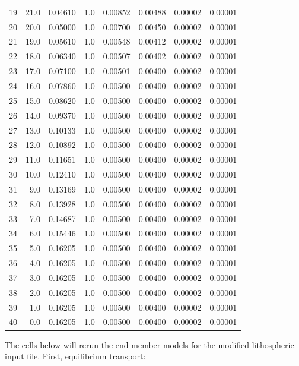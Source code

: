 \documentclass[draft]{agujournal2019}
\begin{document}
\begin{table} [H]
\begin{tabular}{r | r | r | r | r | r | r | r}
19 & 21.0 & 0.04610 & 1.0 & 0.00852 & 0.00488 & 0.00002 & 0.00001 \\
20 & 20.0 & 0.05000 & 1.0 & 0.00700 & 0.00450 & 0.00002 & 0.00001 \\
21 & 19.0 & 0.05610 & 1.0 & 0.00548 & 0.00412 & 0.00002 & 0.00001 \\
22 & 18.0 & 0.06340 & 1.0 & 0.00507 & 0.00402 & 0.00002 & 0.00001 \\
23 & 17.0 & 0.07100 & 1.0 & 0.00501 & 0.00400 & 0.00002 & 0.00001 \\
24 & 16.0 & 0.07860 & 1.0 & 0.00500 & 0.00400 & 0.00002 & 0.00001 \\
25 & 15.0 & 0.08620 & 1.0 & 0.00500 & 0.00400 & 0.00002 & 0.00001 \\
26 & 14.0 & 0.09370 & 1.0 & 0.00500 & 0.00400 & 0.00002 & 0.00001 \\
27 & 13.0 & 0.10133 & 1.0 & 0.00500 & 0.00400 & 0.00002 & 0.00001 \\
28 & 12.0 & 0.10892 & 1.0 & 0.00500 & 0.00400 & 0.00002 & 0.00001 \\
29 & 11.0 & 0.11651 & 1.0 & 0.00500 & 0.00400 & 0.00002 & 0.00001 \\
30 & 10.0 & 0.12410 & 1.0 & 0.00500 & 0.00400 & 0.00002 & 0.00001 \\
31 &  9.0 & 0.13169 & 1.0 & 0.00500 & 0.00400 & 0.00002 & 0.00001 \\
32 &  8.0 & 0.13928 & 1.0 & 0.00500 & 0.00400 & 0.00002 & 0.00001 \\
33 &  7.0 & 0.14687 & 1.0 & 0.00500 & 0.00400 & 0.00002 & 0.00001 \\
34 &  6.0 & 0.15446 & 1.0 & 0.00500 & 0.00400 & 0.00002 & 0.00001 \\
35 &  5.0 & 0.16205 & 1.0 & 0.00500 & 0.00400 & 0.00002 & 0.00001 \\
36 &  4.0 & 0.16205 & 1.0 & 0.00500 & 0.00400 & 0.00002 & 0.00001 \\
37 &  3.0 & 0.16205 & 1.0 & 0.00500 & 0.00400 & 0.00002 & 0.00001 \\
38 &  2.0 & 0.16205 & 1.0 & 0.00500 & 0.00400 & 0.00002 & 0.00001 \\
39 &  1.0 & 0.16205 & 1.0 & 0.00500 & 0.00400 & 0.00002 & 0.00001 \\
40 &  0.0 & 0.16205 & 1.0 & 0.00500 & 0.00400 & 0.00002 & 0.00001 \\
\hline
\end{tabular}
\end{table}


The cells below will rerun the end member models for the modified lithospheric input file. First, equilibrium transport:
\end{document}
